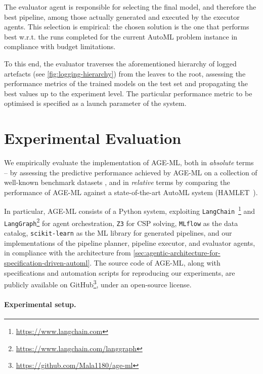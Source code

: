 \documentclass[runningheads]{llncs}
\newcommand{\ourapproach}[0]{\textsc{AGE-ML}}
\begin{document}
The evaluator agent is responsible for selecting the final model,
and therefore the best pipeline,
among those actually generated and executed by the executor agents.
%
This selection is empirical:
the chosen solution is the one that performs best
w.r.t. the runs completed for the current \ac{AutoML} problem instance%
\textemdash{}in compliance with budget limitations.

To this end,
the evaluator traverses the aforementioned hierarchy of logged artefacts
(see \cref{fig:logging-hierarchy})
from the leaves to the root,
assessing the performance metrics of the trained models on the test set and propagating the best values up to the experiment level.
%
The particular performance metric to be optimised is specified as a launch parameter of the system.

\section{Experimental Evaluation}
\label{sec:experimental-evaluation}

We empirically evaluate the implementation of \ourapproach{},
both in \emph{absolute} terms
-- by assessing the predictive performance achieved by \ourapproach{} on a collection of well-known benchmark datasets \textendash{},
and in \emph{relative} terms%
\textemdash{}by comparing the performance of \ourapproach{} against a state-of-the-art \ac{AutoML} system
(HAMLET~\cite{FranciaGP23}).

In particular,
\ourapproach{} consists of a Python system,
exploiting \texttt{LangChain}~\cite{Mavroudis2024}\footnote{\url{https://www.langchain.com}} and \texttt{LangGraph}\footnote{\url{https://www.langchain.com/langgraph}} for agent orchestration,
\texttt{Z3} for \ac{CSP} solving,
\texttt{MLflow} as the data catalog,
\texttt{scikit-learn} as the \ac{ML} library for generated pipelines,
and our implementations of the pipeline planner, pipeline executor, and evaluator agents,
in compliance with the architecture from \cref{sec:agentic-architecture-for-specification-driven-automl}.
%
The source code of \ourapproach{},
along with specifications and automation scripts for reproducing our experiments,
are publicly available on GitHub\footnote{\label{url:repo}\url{https://github.com/Mala1180/age-ml}},
under an open-source license.

\paragraph{Experimental setup.}
\label{subsec:experimental-design}
\end{document}
